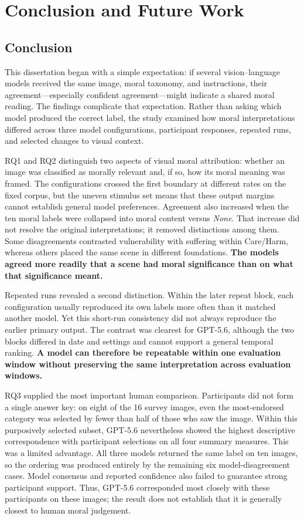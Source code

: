 \chapter{Conclusion and Future Work}
\label{Chap6}

\section{Conclusion}

This dissertation began with a simple expectation: if several
vision--language models received the same image, moral taxonomy, and
instructions, their agreement---especially confident agreement---might indicate
a shared moral reading. The findings complicate that expectation. Rather than
asking which model produced the correct label, the study examined how moral
interpretations differed across three model configurations, participant
responses, repeated runs, and selected changes to visual context.

RQ1 and RQ2 distinguish two aspects of visual moral attribution: whether an
image was classified as morally relevant and, if so, how its moral meaning was
framed. The configurations crossed the first boundary at
different rates on the fixed corpus, but the uneven stimulus set means that
these output margins cannot establish general model preferences. Agreement
also increased when the ten moral labels were collapsed into moral content
versus \textit{None}. That increase did not resolve the original
interpretations; it removed distinctions among them. Some disagreements
contrasted vulnerability with suffering within Care/Harm, whereas others
placed the same scene in different foundations. \textbf{The models agreed more
readily that a scene had moral significance than on what that significance
meant.}

Repeated runs revealed a second distinction. Within the later repeat block,
each configuration usually reproduced its own labels more often than it matched
another model. Yet this short-run consistency did not always reproduce the
earlier primary output. The contrast was clearest for GPT-5.6, although the two
blocks differed in date and settings and cannot support a general temporal
ranking. \textbf{A model can therefore be repeatable within one evaluation
window without preserving the same interpretation across evaluation windows.}

RQ3 supplied the most important human comparison. Participants did not form a
single answer key: on eight of the 16 survey images, even the most-endorsed
category was selected by fewer than half of those who saw the image. Within
this purposively selected subset, GPT-5.6 nevertheless showed the highest
descriptive correspondence with participant selections on all four summary
measures. This was a limited advantage. All three models returned the same
label on ten images, so the ordering was produced entirely by the remaining six
model-disagreement cases. Model consensus and reported confidence also failed
to guarantee strong participant support. Thus, GPT-5.6 corresponded most
closely with these participants on these images; the result does not establish
that it is generally closest to human moral judgement.

